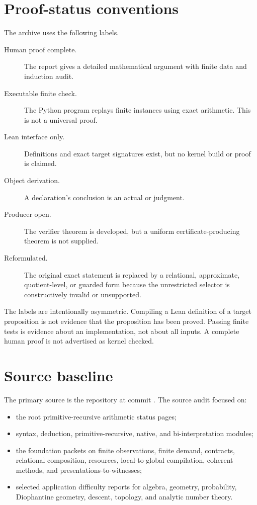 \section{Proof-status conventions}

The archive uses the following labels.

\begin{description}
  \item[Human proof complete.] The report gives a detailed mathematical argument with finite data and induction audit.
  \item[Executable finite check.] The Python program replays finite instances using exact arithmetic.  This is not a universal proof.
  \item[Lean interface only.] Definitions and exact target signatures exist, but no kernel build or proof is claimed.
  \item[Object derivation.] A declaration's conclusion is an actual  or  judgment.
  \item[Producer open.] The verifier theorem is developed, but a uniform certificate-producing theorem is not supplied.
  \item[Reformulated.] The original exact statement is replaced by a relational, approximate, quotient-level, or guarded form because the unrestricted selector is constructively invalid or unsupported.
\end{description}

The labels are intentionally asymmetric.  Compiling a Lean definition of a target proposition is not evidence that the proposition has been proved.  Passing finite tests is evidence about an implementation, not about all inputs.  A complete human proof is not advertised as kernel checked.

\section{Source baseline}

The primary source is the \repo{} repository at commit
.  The source audit focused on:

\begin{itemize}
  \item the root primitive-recursive arithmetic status pages;
  \item {} syntax, deduction, primitive-recursive, native, and bi-interpretation modules;
  \item the foundation packets on finite observations, finite demand, contracts, relational composition, resources, local-to-global compilation, coherent methods, and presentations-to-witnesses;
  \item selected application difficulty reports for algebra, geometry, probability, Diophantine geometry, descent, topology, and analytic number theory.
\end{itemize}

